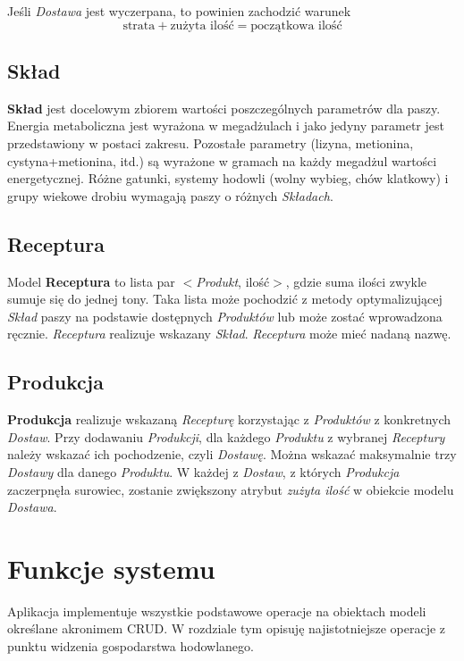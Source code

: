 \documentclass[shortabstract]{iithesis}
\begin{document}
Jeśli \textit{Dostawa} jest wyczerpana, to powinien zachodzić warunek $$ \textrm{strata} + \textrm{zużyta ilość} = \textrm{początkowa ilość} $$


\section{Skład}

\textbf{Skład} jest docelowym zbiorem wartości poszczególnych parametrów dla paszy. Energia metaboliczna jest wyrażona w megadżulach i jako jedyny parametr jest przedstawiony w postaci zakresu. Pozostałe parametry (lizyna, metionina, cystyna+metionina, itd.) są wyrażone w gramach na każdy megadżul wartości energetycznej. Różne gatunki, systemy hodowli (wolny wybieg, chów klatkowy) i  grupy wiekowe drobiu wymagają paszy o różnych \textit{Składach}.


\section{Receptura}

Model \textbf{Receptura} to lista par $<$\textit{Produkt}, ilość$>$, gdzie suma ilości zwykle sumuje się do jednej tony. Taka lista może pochodzić z metody optymalizującej \textit{Skład} paszy na podstawie dostępnych \textit{Produktów} lub może zostać wprowadzona ręcznie. \textit{Receptura} realizuje wskazany \textit{Skład}. \textit{Receptura} może mieć nadaną nazwę.

\section{Produkcja}

\textbf{Produkcja} realizuje wskazaną \textit{Recepturę} korzystając z \textit{Produktów} z konkretnych \textit{Dostaw}. Przy dodawaniu \textit{Produkcji}, dla każdego \textit{Produktu} z wybranej \textit{Receptury} należy wskazać ich pochodzenie, czyli \textit{Dostawę}. Można wskazać maksymalnie trzy \textit{Dostawy} dla danego \textit{Produktu}. W każdej z \textit{Dostaw}, z których \textit{Produkcja} zaczerpnęła surowiec, zostanie zwiększony atrybut \textit{zużyta ilość} w obiekcie modelu \textit{Dostawa}.


\chapter{Funkcje systemu}

Aplikacja implementuje wszystkie podstawowe operacje na obiektach modeli określane akronimem CRUD. 
W rozdziale tym opisuję najistotniejsze operacje z punktu widzenia gospodarstwa hodowlanego.
\end{document}
